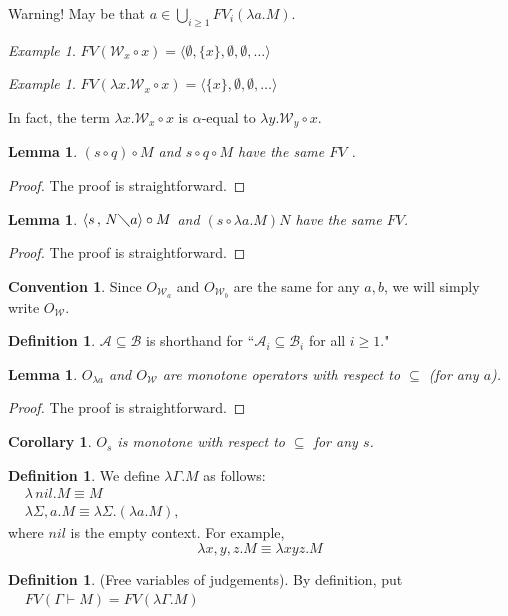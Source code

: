 \documentclass[11pt]{amsart}
\theoremstyle{plain}
\newtheorem{corollary}[theorem]{Corollary}
\newtheorem{lemma}[theorem]{Lemma}
\theoremstyle{definition}
\newtheorem{definition}[theorem]{Definition}
\newtheorem{convention}[theorem]{Convention}
\theoremstyle{remark}
\newtheorem{example}[theorem]{Example}
\numberwithin{equation}{section}
\newcommand{\ci}{\circ}
\newcommand{\mi}{\,,\,}
\newcommand{\is}{\diagdown}
\newcommand{\la}{\langle}
\newcommand{\ra}{\rangle}
\newcommand{\x}{a}
\newcommand{\y}{b}
\renewcommand{\pi}{\mathcal{W}}
\begin{document}
Warning! May be that $\x\in\bigcup_{i\geqslant 1}
 FV_i(\lambda \x.M)$.
  \begin{example}
$FV(\pi_x\ci x)=\la\emptyset,\{x\},\emptyset,\emptyset,\ldots\ra$
\end{example}
\begin{example}
$FV(\lambda x.\pi_x\ci x)=\la\{x\},\emptyset,\emptyset,\ldots\ra$
\end{example}
In fact, the term $\lambda x.\pi_x\ci x$ is $\alpha$-equal to
$\lambda y.\pi_y\ci x$.
\begin{lemma}\label{corollary23} $(s\ci q)\ci M$ and $s\ci q\ci M$ have
the same
 $FV$ .
\end{lemma}
\begin{proof}The proof is straightforward.
\end{proof}
\begin{lemma}\label{corollary3} $\langle s\mi N\is \x\rangle\circ M$ and $(s\circ \lambda
\x.M)N$ have the same $FV$.
\end{lemma}
\begin{proof}The proof is straightforward.
\end{proof}
\begin{convention}Since $O_{\pi_{\x}}$ and $O_{\pi_{\y}}$ are the
same for any $\x,\y$, we will simply write $O_{\pi}$.
\end{convention}
\begin{definition}\label{mon}
 $\mathcal{A}\subseteq\mathcal{B}$ is shorthand for
``$\mathcal{A}_i\subseteq\mathcal{B}_i$ for all $i\geqslant 1$."
\end{definition}
\begin{lemma}\label{monotone}$O_{\lambda \x}$ and $O_{\pi}$ are monotone
operators with respect to $\subseteq$ (for any $\x$).
\end{lemma}
\begin{proof}The proof is straightforward.
\end{proof}
\begin{corollary}$O_s$ is monotone with respect to $\subseteq$ for any $s$.
\end{corollary}
\begin{definition}We define  $\lambda\Gamma.M$  as follows:
\\
$
\begin{array}{ll}
& \lambda\,nil.M \equiv M\\
& \lambda\Sigma,\x.M \equiv\lambda\Sigma.(\lambda \x.M),
\end{array}
$\\[5pt] where $nil$ is the empty context. For example,
$$\lambda x,y,z.M\equiv\lambda xyz.M$$
\end{definition}
\begin{definition}(Free variables of judgements). By definition, put\\
$
\begin{array}{ll}
& FV(\Gamma\vdash M)=FV(\lambda\Gamma.M)\\
\end{array}
$
\end{definition}
\end{document}
